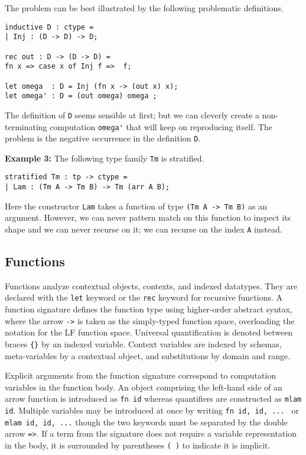 \documentclass[11pt]{article}
\begin{document}
The problem can be best illustrated by  the following problematic definitions.

\begin{verbatim}
inductive D : ctype = 
| Inj : (D -> D) -> D;

rec out : D -> (D -> D) = 
fn x => case x of Inj f =>  f;

let omega  : D = Inj (fn x -> (out x) x);
let omega' : D = (out omega) omega ; 
\end{verbatim}

The definition of \verb+D+ seems sensible at first; but we can
cleverly create a non-terminating computation \verb+omega'+ that
will keep on reproducing itself. The problem is the negative occurrence
in the definition \verb+D+.


\textbf{Example 3:} The following type family \texttt{Tm} is stratified.
\begin{verbatim}
stratified Tm : tp -> ctype =
| Lam : (Tm A -> Tm B) -> Tm (arr A B);
\end{verbatim}

Here the constructor \verb+Lam+ takes a function of type
\verb+(Tm A -> Tm B)+ as an argument. However, we can never
pattern match on this function to inspect its shape and we can never
recurse on it; we can recurse on the index \lstinline!A! instead.


\subsection{Functions}
Functions analyze contextual objects, contexts, and indexed datatypes. They are declared with the \texttt{let} keyword or the \texttt{rec} keyword for recursive functions. A function signature defines the function type using higher-order abstract syntax, where the arrow \texttt{->} is taken as the simply-typed function space, overloading the notation for the LF function space. Universal quantification is denoted between braces \texttt{\{\}} by an indexed variable. Context variables are indexed by schemas, meta-variables by a contextual object, and substitutions by domain and range.

Explicit arguments from the function signature correspond to computation variables in the function body. An object comprising the left-hand side of an arrow function is introduced as \texttt{fn id} whereas quantifiers are constructed as \texttt{mlam id}. Multiple variables may be introduced at once by writing \texttt{fn id, id, ... } or \texttt{mlam id, id, ...} though the two keywords must be separated by the double arrow \texttt{=>}. If a term from the signature does not require a variable representation in the body, it is surrounded by parentheses \texttt{( )} to indicate it is implicit. \\
\end{document}
